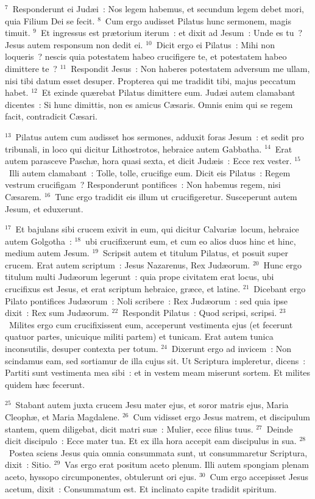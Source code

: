 ${}^{7}$~Responderunt ei Jud\ae i~: Nos legem habemus, et secundum legem debet mori, quia Filium Dei se fecit.
${}^{8}$~Cum ergo audisset Pilatus hunc sermonem, magis timuit.
${}^{9}$~Et ingressus est pr\ae torium iterum~: et dixit ad Jesum~: Unde es tu~? Jesus autem responsum non dedit ei.
${}^{10}$~Dicit ergo ei Pilatus~: Mihi non loqueris~? nescis quia potestatem habeo crucifigere te, et potestatem habeo dimittere te~?
${}^{11}$~Respondit Jesus~: Non haberes potestatem adversum me ullam, nisi tibi datum esset desuper. Propterea qui me tradidit tibi, majus peccatum habet.
${}^{12}$~Et exinde qu\ae rebat Pilatus dimittere eum. Jud\ae i autem clamabant dicentes~: Si hunc dimittis, non es amicus C\ae saris. Omnis enim qui se regem facit, contradicit C\ae sari.


${}^{13}$~Pilatus autem cum audisset hos sermones, adduxit foras Jesum~: et sedit pro tribunali, in loco qui dicitur Lithostrotos, hebraice autem Gabbatha.
${}^{14}$~Erat autem parasceve Pasch\ae , hora quasi sexta, et dicit Jud\ae is~: Ecce rex vester.
${}^{15}$~Illi autem clamabant~: Tolle, tolle, crucifige eum. Dicit eis Pilatus~: Regem vestrum crucifigam~? Responderunt pontifices~: Non habemus regem, nisi C\ae sarem.
${}^{16}$~Tunc ergo tradidit eis illum ut crucifigeretur. Susceperunt autem Jesum, et eduxerunt.


${}^{17}$~Et bajulans sibi crucem exivit in eum, qui dicitur Calvari\ae\ locum, hebraice autem Golgotha~:
${}^{18}$~ubi crucifixerunt eum, et cum eo alios duos hinc et hinc, medium autem Jesum.
${}^{19}$~Scripsit autem et titulum Pilatus, et posuit super crucem. Erat autem scriptum~: Jesus Nazarenus, Rex Jud\ae orum.
${}^{20}$~Hunc ergo titulum multi Jud\ae orum legerunt~: quia prope civitatem erat locus, ubi crucifixus est Jesus, et erat scriptum hebraice, gr\ae ce, et latine.
${}^{21}$~Dicebant ergo Pilato pontifices Jud\ae orum~: Noli scribere~: Rex Jud\ae orum~: sed quia ipse dixit~: Rex sum Jud\ae orum.
${}^{22}$~Respondit Pilatus~: Quod scripsi, scripsi.
${}^{23}$~Milites ergo cum crucifixissent eum, acceperunt vestimenta ejus (et fecerunt quatuor partes, unicuique militi partem) et tunicam. Erat autem tunica inconsutilis, desuper contexta per totum.
${}^{24}$~Dixerunt ergo ad invicem~: Non scindamus eam, sed sortiamur de illa cujus sit. Ut Scriptura impleretur, dicens~: Partiti sunt vestimenta mea sibi~: et in vestem meam miserunt sortem. Et milites quidem h\ae c fecerunt.


${}^{25}$~Stabant autem juxta crucem Jesu mater ejus, et soror matris ejus, Maria Cleoph\ae , et Maria Magdalene.
${}^{26}$~Cum vidisset ergo Jesus matrem, et discipulum stantem, quem diligebat, dicit matri su\ae~: Mulier, ecce filius tuus.
${}^{27}$~Deinde dicit discipulo~: Ecce mater tua. Et ex illa hora accepit eam discipulus in sua.
${}^{28}$~Postea sciens Jesus quia omnia consummata sunt, ut consummaretur Scriptura, dixit~: Sitio.
${}^{29}$~Vas ergo erat positum aceto plenum. Illi autem spongiam plenam aceto, hyssopo circumponentes, obtulerunt ori ejus.
${}^{30}$~Cum ergo accepisset Jesus acetum, dixit~: Consummatum est. Et inclinato capite tradidit spiritum.



